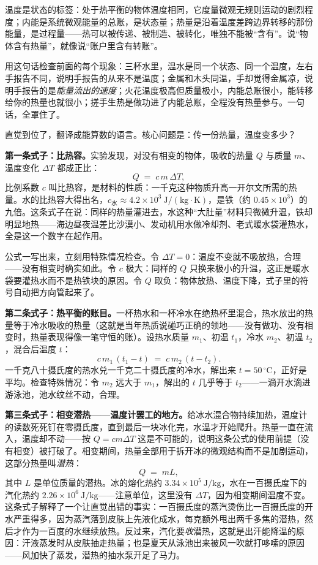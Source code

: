 
\begin{oneline}
温度是状态的标签：处于热平衡的物体温度相同，它度量微观无规则运动的剧烈程度；内能是系统微观能量的总账，是状态量；热量是沿着温度差跨边界转移的那份能量，是过程量——热可以被传递、被制造、被转化，唯独不能被“含有”。说“物体含有热量”，就像说“账户里含有转账”。
\end{oneline}

用这句话检查前面的每个现象：三杯水里，温水是同一个状态、同一个温度，左右手报告不同，说明手报告的从来不是温度；金属和木头同温，手却觉得金属凉，说明手报告的是\emph{能量流出的速度}；火花温度极高但质量极小，内能总账很小，能转移给你的热量也就很小；搓手生热是做功进了内能总账，全程没有热量参与。一句话，全罩住了。


直觉到位了，翻译成能算数的语言。核心问题是：传一份热量，温度变多少？

\textbf{第一条式子：比热容。}实验发现，对没有相变的物体，吸收的热量 \(Q\) 与质量 \(m\)、温度变化 \(\Delta T\) 都成正比：
\[
Q \;=\; c\, m\, \Delta T,
\]
比例系数 \(c\) 叫比热容，是材料的性质：一千克这种物质升高一开尔文所需的热量。水的比热容大得出名，\(c_{\text{水}} \approx 4.2\times10^{3}\ \mathrm{J/(kg\cdot K)}\)，是铁（约 \(0.45\times10^{3}\)）的九倍。这条式子在说：同样的热量灌进去，水这种“大肚量”材料只微微升温，铁却明显地热——海边昼夜温差比沙漠小、发动机用水做冷却剂、老式暖水袋灌热水，全是这一个数字在起作用。

公式一写出来，立刻用特殊情况检查。令 \(\Delta T = 0\)：温度不变就不吸放热，合理——没有相变时确实如此。令 \(c\) 极大：同样的 \(Q\) 只换来极小的升温，这正是暖水袋要灌热水而不是热铁块的原因。令 \(Q\) 取负：物体放热、温度下降，式子里的符号自动把方向管起来了。

\textbf{第二条式子：热平衡的账目。}一杯热水和一杯冷水在绝热杯里混合，热水放出的热量等于冷水吸收的热量（这就是当年热质说碰巧正确的领地——没有做功、没有相变时，热量表现得像一笔守恒的账）。设热水质量 \(m_1\)、初温 \(t_1\)，冷水 \(m_2\)、初温 \(t_2\)，混合后温度 \(t\)：
\[
c\,m_1\,(t_1 - t) \;=\; c\,m_2\,(t - t_2).
\]
一千克八十摄氏度的热水兑一千克二十摄氏度的冷水，解出来 \(t = 50\,^\circ\mathrm{C}\)，正好是平均。检查特殊情况：令 \(m_2\) 远大于 \(m_1\)，解出的 \(t\) 几乎等于 \(t_2\)——一滴开水滴进游泳池，池水纹丝不动，合理。

\textbf{第三条式子：相变潜热——温度计罢工的地方。}给冰水混合物持续加热，温度计的读数死死钉在零摄氏度，直到最后一块冰化完，水温才开始爬升。热量一直在流入，温度却不动——按 \(Q=cm\Delta T\) 这是不可能的，说明这条公式的使用前提（没有相变）被打破了。相变期间，热量全部用于拆开冰的微观结构而不是加剧运动，这部分热量叫\emph{潜热}：
\[
Q \;=\; mL,
\]
其中 \(L\) 是单位质量的潜热。冰的熔化热约 \(3.34\times10^{5}\ \mathrm{J/kg}\)，水在一百摄氏度下的汽化热约 \(2.26\times10^{6}\ \mathrm{J/kg}\)——注意单位，这里没有 \(\Delta T\)，因为相变期间温度不变。这条式子解释了一个让直觉出错的事实：一百摄氏度的蒸汽烫伤比一百摄氏度的开水严重得多，因为蒸汽落到皮肤上先液化成水，每克额外甩出两千多焦的潜热，然后才作为一百度的水继续放热。反过来，汽化要\emph{收}潜热，这就是出汗能降温的原因：汗液蒸发时从皮肤抽走热量；也是夏天从泳池出来被风一吹就打哆嗦的原因——风加快了蒸发，潜热的抽水泵开足了马力。

